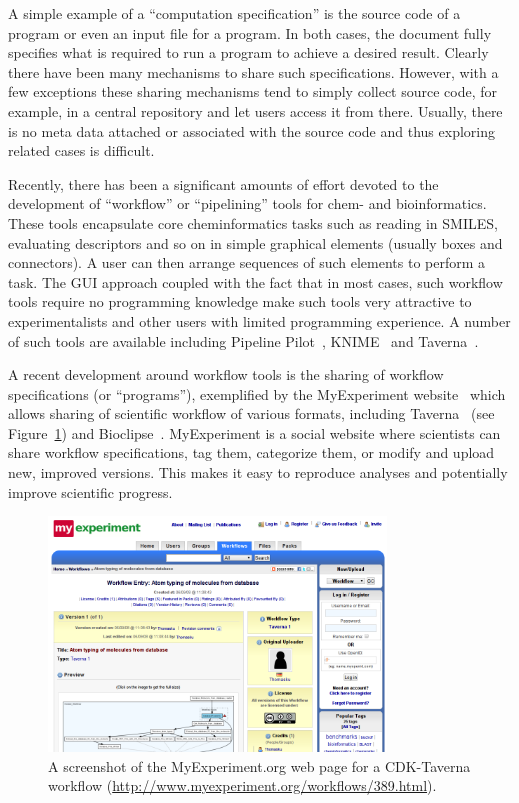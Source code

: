 \documentclass[11pt]{book}
\begin{document}
A simple example of a ``computation specification'' is the source code
of a program or even an input file for a program. In both cases, the
document fully specifies what is required to run a program to achieve
a desired result. Clearly there have been many mechanisms to share
such specifications. However, with a few exceptions these sharing
mechanisms tend to simply collect source code, for example, in a
central repository and let users access it from there. Usually, there
is no meta data attached or associated with the source code and thus
exploring related cases is difficult.

Recently, there has been a significant amounts of effort devoted to the
development of ``workflow'' or ``pipelining'' tools for chem- and
bioinformatics. These tools encapsulate core cheminformatics tasks
such as reading in SMILES, evaluating descriptors and so on in simple
graphical elements (usually boxes and connectors). A user can then
arrange sequences of such elements to perform a task. The GUI approach
coupled with the fact that in most cases, such workflow tools require
no programming knowledge make such tools very attractive to
experimentalists and other users with limited programming
experience. A number of such tools are available including Pipeline
Pilot~\cite{url:pipelinepilot}, KNIME~\cite{Berthold2009} and
Taverna~\cite{Oinn2004}.

A recent development around workflow tools is the sharing of workflow
specifications (or ``programs''), exemplified by the MyExperiment
website~\cite{Goble2010} which allows sharing of scientific workflow
of various formats, including Taverna~\cite{Oinn2004,Kuhn2010}
(see Figure~\ref{fig:myexperiment})
and Bioclipse~\cite{Spjuth2009,Spjuth2007}.
MyExperiment is a social website where scientists can share
workflow specifications, tag them, categorize them, or modify and
upload new, improved versions. This makes it easy to
reproduce analyses and potentially improve scientific progress.

\begin{figure}[bt]
\begin{center}
\includegraphics[width=0.8\textwidth]{graphics/myexperiment.png}
\end{center}
\caption{A screenshot of the MyExperiment.org web page for a
CDK-Taverna workflow (\url{http://www.myexperiment.org/workflows/389.html}).}
\label{fig:myexperiment}
\end{figure}
\end{document}
